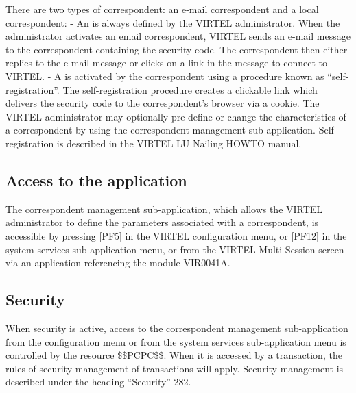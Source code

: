 \documentclass[letterpaper,10pt,english]{sphinxmanual}
\begin{document}
There are two types of correspondent: an e-mail correspondent and a local correspondent:
- An  is always defined by the VIRTEL administrator. When the administrator activates an email correspondent, VIRTEL sends an e-mail message to the correspondent containing the security code. The correspondent then either replies to the e-mail message or clicks on a link in the message to connect to VIRTEL.
- A  is activated by the correspondent using a procedure known as “self-registration”. The self-registration procedure creates a clickable link which delivers the security code to the correspondent’s browser via a cookie. The VIRTEL administrator may optionally pre-define or change the characteristics of a correspondent by using the correspondent management sub-application. Self-registration is described in the VIRTEL LU Nailing HOWTO manual.


\subsection{Access to the application}
\label{\detokenize{audit_operations_ and_performance:access-to-the-application}}\label{\detokenize{audit_operations_ and_performance:index-48}}
The correspondent management sub-application, which allows the VIRTEL administrator to define the parameters
associated with a correspondent, is accessible by pressing {[}PF5{]} in the VIRTEL configuration menu, or {[}PF12{]} in the
system services sub-application menu, or from the VIRTEL Multi-Session screen via an application referencing the
module VIR0041A.


\subsection{Security}
\label{\detokenize{audit_operations_ and_performance:security}}\label{\detokenize{audit_operations_ and_performance:index-49}}
When security is active, access to the correspondent management sub-application from the configuration menu or
from the system services sub-application menu is controlled by the resource \$\$PCPC\$\$.
When it is accessed by a transaction, the rules of security management of transactions will apply.
Security management is described under the heading “Security” 282.
\end{document}
